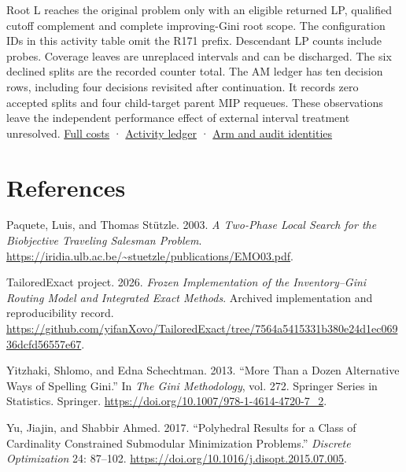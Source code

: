 \documentclass[
  american,
  11pt,
]{article}
\newlength{\cslhangindent}
\newenvironment{CSLReferences}[2] %
 {\begin{list}{}{%
  \setlength{\itemindent}{0pt}
  \setlength{\leftmargin}{0pt}
  \setlength{\parsep}{0pt}
  \ifodd #1
   \setlength{\leftmargin}{\cslhangindent}
   \setlength{\itemindent}{-1\cslhangindent}
  \fi
  \setlength{\itemsep}{#2\baselineskip}}}
 {\end{list}}
\begin{document}
Root L reaches the original problem only with an eligible returned LP,
qualified cutoff complement and complete improving-Gini root scope. The
configuration IDs in this activity table omit the R171 prefix.
Descendant LP counts include probes. Coverage leaves are unreplaced
intervals and can be discharged. The six declined splits are the
recorded counter total. The AM ledger has ten decision rows, including
four decisions revisited after continuation. It records zero accepted
splits and four child-target parent MIP requeues. These observations
leave the independent performance effect of external interval treatment
unresolved.
\href{https://github.com/yifanXovo/TailoredExact/blob/codex/round172-journal-manuscript/results/unified_exact_round171/cost_report.json}{Full
costs} ·
\href{https://github.com/yifanXovo/TailoredExact/blob/codex/round172-journal-manuscript/results/unified_exact_round171/activity.json}{Activity
ledger} ·
\href{https://github.com/yifanXovo/TailoredExact/blob/codex/round172-journal-manuscript/results/unified_exact_round171/complete_arms.json}{Arm
and audit identities}

\clearpage

\section{References}\label{references}

\protect{}\label{refs}
\begin{CSLReferences}{1}{1}
Paquete, Luis, and Thomas Stützle. 2003. \emph{A Two-Phase Local Search
for the Biobjective Traveling Salesman Problem}.
\url{https://iridia.ulb.ac.be/~stuetzle/publications/EMO03.pdf}.

TailoredExact project. 2026. \emph{Frozen Implementation of the
Inventory--Gini Routing Model and Integrated Exact Methods}. Archived
implementation and reproducibility record.
\url{https://github.com/yifanXovo/TailoredExact/tree/7564a5415331b380e24d1ec06936dcfd56557e67}.

Yitzhaki, Shlomo, and Edna Schechtman. 2013. {``More Than a Dozen
Alternative Ways of Spelling Gini.''} In \emph{The Gini Methodology},
vol. 272. Springer Series in Statistics. Springer.
\url{https://doi.org/10.1007/978-1-4614-4720-7_2}.

Yu, Jiajin, and Shabbir Ahmed. 2017. {``Polyhedral Results for a Class
of Cardinality Constrained Submodular Minimization Problems.''}
\emph{Discrete Optimization} 24: 87--102.
\url{https://doi.org/10.1016/j.disopt.2015.07.005}.

\end{CSLReferences}
\end{document}
